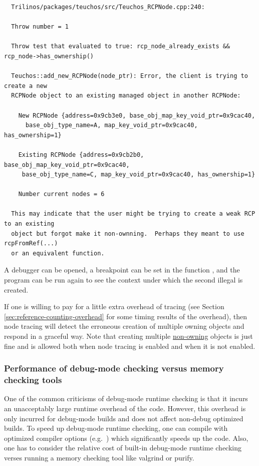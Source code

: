 \documentclass[pdf,ps2pdf,11pt]{SANDreport}
\begin{document}
{\small\begin{verbatim}
  Trilinos/packages/teuchos/src/Teuchos_RCPNode.cpp:240:
  
  Throw number = 1
  
  Throw test that evaluated to true: rcp_node_already_exists && rcp_node->has_ownership()
  
  Teuchos::add_new_RCPNode(node_ptr): Error, the client is trying to create a new
  RCPNode object to an existing managed object in another RCPNode:
  
    New RCPNode {address=0x9cb3e0, base_obj_map_key_void_ptr=0x9cac40,
      base_obj_type_name=A, map_key_void_ptr=0x9cac40, has_ownership=1}
  
    Existing RCPNode {address=0x9cb2b0, base_obj_map_key_void_ptr=0x9cac40,
     base_obj_type_name=C, map_key_void_ptr=0x9cac40, has_ownership=1}
  
    Number current nodes = 6
  
  This may indicate that the user might be trying to create a weak RCP to an existing
  object but forgot make it non-ownning.  Perhaps they meant to use rcpFromRef(...)
  or an equivalent function.
\end{verbatim}}

A debugger can be opened, a breakpoint can be set in the function
{}, and the program can be run
again to see the context under which the second illegal
{} is created.

If one is willing to pay for a little extra overhead of
{} tracing (see Section
{}\ref{sec:reference-counting-overhead} for some timing results of the
overhead), then node tracing will detect the erroneous creation of
multiple owning {} objects and respond in a graceful way.
Note that creating multiple {}\underline{non-owning} {}
objects is just fine and is allowed both when node tracing is enabled
and when it is not enabled.


%
{}\subsubsection{Performance of debug-mode checking versus memory
checking tools}
%

One of the common criticisms of debug-mode runtime checking is that it
incurs an unacceptably large runtime overhead of the code.  However,
this overhead is only incurred for debug-mode builds and does not
affect non-debug optimized builds.  To speed up debug-mode runtime
checking, one can compile with optimized compiler options (e.g.\
{}) which significantly speeds up the code.  Also, one has to
consider the relative cost of built-in debug-mode runtime checking
verses running a memory checking tool like valgrind or purify.
\end{document}
